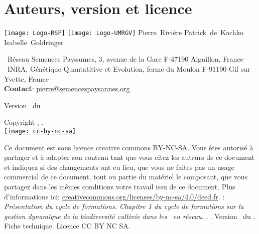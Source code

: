 \section*{Auteurs, version et licence}

\begin{center}
\texttt{[image: Logo-RSP]}
\hspace{1cm}
\texttt{[image: Logo-UMRGV]}
\vfill
\normalsize
Pierre~Rivière \hspace{.5cm}
Patrick~de~Kochko \hspace{.5cm}
Isabelle~Goldringer \\
\small
\end{center}
\noindent{}~Réseau Semences Paysannes, 3, avenue de la Gare F-47190 Aiguillon, France \\
\noindent{}~INRA, Génétique Quantatitive et Evolution, ferme du Moulon F-91190 Gif sur Yvette, France \\
\noindent\up{*} \textbf{Contact}: \href{mailto:pierre@semencespaysannes.org}{\textcolor{mln-green} {pierre@semencespaysannes.org}}

\vfill

\begin{center}
\large Version \versionCF~du \dateversionCF
\end{center}

\vfill
\normalsize
\begin{center}
Copyright \RSP, \INRA.
~\\
\href{http://creativecommons.org/licenses/by-nc-sa/4.0/deed.fr}{\texttt{[image: cc-by-nc-sa]}}
\end{center}
\small
Ce document est sous licence creative commons BY-NC-SA.
Vous êtes autorisé à partager et à adapter son contenu tant 
que vous citez les auteurs de ce document et indiquez si des changements ont eu lieu, 
que vous ne faites pas un usage commercial de ce document, tout ou partie du matériel le composant,
que vous partagez dans les mêmes conditions votre travail issu de ce document. 
Plus d'informations ici: \url{creativecommons.org/licenses/by-nc-sa/4.0/deed.fr}.
\vfill
{}:
\textit{
Présentation du cycle de formations.
Chapitre 1 du cycle de formations sur la gestion dynamique de la biodiversité cultivée dans les \MSPs~en réseau}.
\RSP, \INRA.
Version \versionCF~du \dateversionCF.
Fiche technique.
Licence CC BY NC SA.

\newpage
